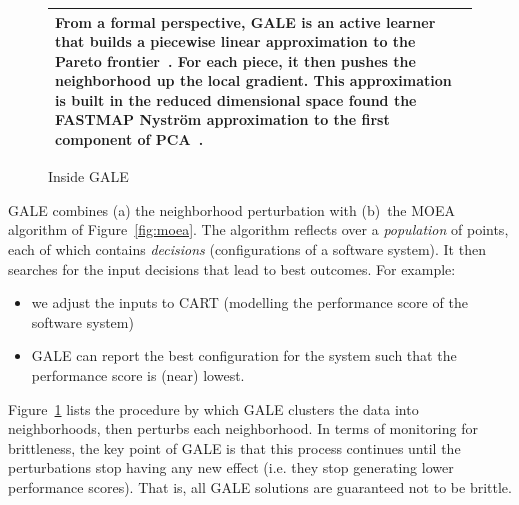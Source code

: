 \documentclass{sig-alternative}
\newcommand{\fig}[1]{Figure~\ref{fig:#1}}
\begin{document}
\begin{figure}[!b]
\begin{tabular}{|p{.95\linewidth}|}
From a formal perspective, GALE is an active learner~\cite{Dasgupta2005} that builds a piecewise linear approximation to the Pareto frontier~\cite{Zuluaga:13}.  
For each piece, it then pushes the neighborhood up the local gradient.  This  approximation is built in the reduced dimensional space found the FASTMAP  Nystr\"om approximation to the first component of PCA~\cite{platt05}.
\\\hline
\end{tabular}
\caption{Inside GALE}\label{fig:gale}
\end{figure}
GALE combines (a) the neighborhood perturbation  with (b)~the MOEA algorithm of \fig{moea}.  The algorithm reflects over a {\em population} of points, each of which contains {\em decisions} (configurations of a software system).  It then searches for the input decisions that lead to best outcomes.  For example:
\begin{itemize}
\item we adjust the inputs to CART (modelling the performance score of the software system)
\item GALE can report the best configuration for the system such that the performance score is (near) lowest.
\end{itemize}

\fig{gale} lists the procedure by which GALE clusters the data into neighborhoods, then perturbs each neighborhood.  In terms of monitoring for brittleness, the key point of GALE is that this process continues until the perturbations stop having any new effect (i.e. they stop generating lower performance scores). That is, all GALE solutions are guaranteed not to be brittle.
\end{document}
